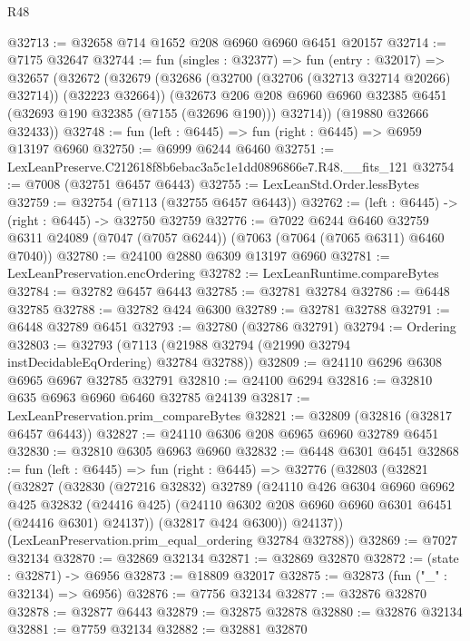 \begin{lexlean}{R48}
\begin{coremodule}
@32713 := @32658 @714 @1652 @208 @6960 @6960 @6451 @20157
@32714 := @7175 @32647
@32744 := fun (singles : @32377) =>
  fun (entry : @32017) =>
  @32657
    (@32672
      (@32679
        (@32686 (@32700 (@32706 (@32713 @32714 @20266) @32714)) (@32223 @32664))
        (@32673
          @206
          @208
          @6960
          @6960
          @32385
          @6451
          (@32693 @190 @32385 (@7155 (@32696 @190)))
          @32714))
      (@19880 @32666 @32433))
@32748 := fun (left : @6445) => fun (right : @6445) => @6959 @13197 @6960
@32750 := @6999 @6244 @6460
@32751 := LexLeanPreserve.C212618f8b6ebac3a5c1e1dd0896866e7.R48.__fits_121
@32754 := @7008 (@32751 @6457 @6443)
@32755 := LexLeanStd.Order.lessBytes
@32759 := @32754 (@7113 (@32755 @6457 @6443))
@32762 := (left : @6445) -> (right : @6445) -> @32750 @32759
@32776 := @7022
    @6244
    @6460
    @32759
    @6311
    @24089
    (@7047 (@7057 @6244))
    (@7063 (@7064 (@7065 @6311) @6460 @7040))
@32780 := @24100 @2880 @6309 @13197 @6960
@32781 := LexLeanPreservation.encOrdering
@32782 := LexLeanRuntime.compareBytes
@32784 := @32782 @6457 @6443
@32785 := @32781 @32784
@32786 := @6448 @32785
@32788 := @32782 @424 @6300
@32789 := @32781 @32788
@32791 := @6448 @32789 @6451
@32793 := @32780 (@32786 @32791)
@32794 := Ordering
@32803 := @32793 (@7113 (@21988 @32794 (@21990 @32794 instDecidableEqOrdering) @32784 @32788))
@32809 := @24110 @6296 @6308 @6965 @6967 @32785 @32791
@32810 := @24100 @6294
@32816 := @32810 @635 @6963 @6960 @6460 @32785 @24139
@32817 := LexLeanPreservation.prim_compareBytes
@32821 := @32809 (@32816 (@32817 @6457 @6443))
@32827 := @24110 @6306 @208 @6965 @6960 @32789 @6451
@32830 := @32810 @6305 @6963 @6960
@32832 := @6448 @6301 @6451
@32868 := fun (left : @6445) =>
  fun (right : @6445) =>
  @32776
    (@32803
      (@32821
        (@32827
          (@32830
            (@27216 @32832)
            @32789
            (@24110
              @426
              @6304
              @6960
              @6962
              @425
              @32832
              (@24416 @425)
              (@24110 @6302 @208 @6960 @6960 @6301 @6451 (@24416 @6301) @24137))
            (@32817 @424 @6300))
          @24137))
      (LexLeanPreservation.prim_equal_ordering @32784 @32788))
@32869 := @7027 @32134
@32870 := @32869 @32134
@32871 := @32869 @32870
@32872 := (state : @32871) -> @6956
@32873 := @18809 @32017
@32875 := @32873 (fun ("_" : @32134) => @6956)
@32876 := @7756 @32134
@32877 := @32876 @32870
@32878 := @32877 @6443
@32879 := @32875 @32878
@32880 := @32876 @32134
@32881 := @7759 @32134
@32882 := @32881 @32870

\end{coremodule}
\end{lexlean}
